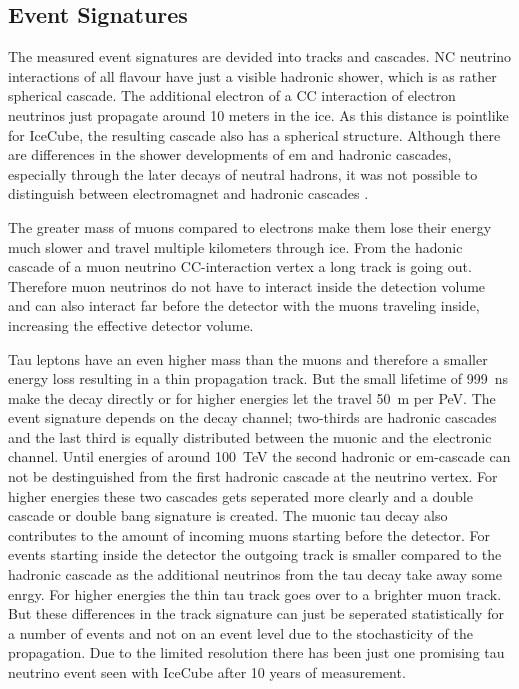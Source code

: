 \subsection{Event Signatures}

The measured event signatures are devided into tracks and cascades.
NC neutrino interactions of all flavour have just a visible hadronic shower, which is as rather spherical cascade.
The additional electron of a CC interaction of electron neutrinos just propagate around 10 meters in the ice.
As this distance is pointlike for IceCube, the resulting cascade also has a spherical structure.
Although there are differences in the shower developments of em and hadronic cascades, especially through the later decays of neutral hadrons, it was not possible to distinguish between electromagnet and hadronic cascades \cite{MainzAnalyse}.

The greater mass of muons compared to electrons make them lose their energy much slower and travel multiple kilometers  through ice.
From the hadonic cascade of a muon neutrino CC-interaction vertex a long track is going out.
Therefore muon neutrinos do not have to interact inside the detection volume and can also interact far before the detector with the muons traveling inside, increasing the effective detector volume.

Tau leptons have an even higher mass than the muons and therefore a smaller energy loss resulting in a thin propagation track.
But the small lifetime of \SI{999}{ns} make the decay directly or for higher energies let the travel \SI{50}{m} per PeV.
The event signature depends on the decay channel; two-thirds are hadronic cascades and the last third is equally distributed between the muonic and the electronic channel.
Until energies of around \SI{100}{TeV} the second hadronic or em-cascade can not be destinguished from the first hadronic cascade at the neutrino vertex.
For higher energies these two cascades gets seperated more clearly and a double cascade or double bang signature is created.
The muonic tau decay also contributes to the amount of incoming muons starting before the detector.
For events starting inside the detector the outgoing track is smaller compared to the hadronic cascade as the additional neutrinos from the tau decay take away some enrgy.
For higher energies the thin tau track goes over to a brighter muon track.
But these differences in the track signature can just be seperated statistically for a number of events and not on an event level due to the stochasticity of the propagation.
Due to the limited resolution there has been just one promising tau neutrino event seen with IceCube after 10 years of measurement.

